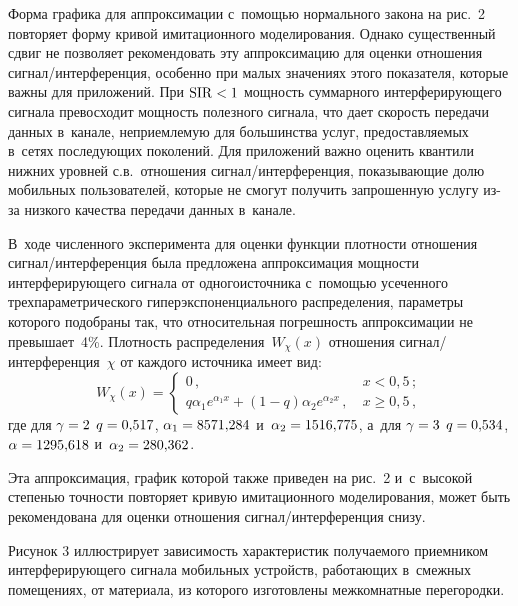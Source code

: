 \begin{multicols}{2}
  Форма графика для аппроксимации с~помощью нормального закона на 
рис.~2 повторяет форму кривой имитационного моделирования. Однако 
существенный сдвиг не позволяет рекомендовать эту аппроксимацию для 
оценки отношения сиг\-нал/ин\-тер\-фе\-рен\-ция, особенно при малых 
значениях этого показателя, которые важны для приложений. При 
$\mathrm{SIR}\hm<1$ мощность суммарного интерферирующего сигнала превосходит 
мощность полезного сигнала, что дает скорость передачи данных в~канале, 
неприемлемую для большинства услуг, предоставляемых в~сетях 
последующих поколений. Для приложений важно оценить квантили нижних 
уровней с.в.\ отношения сиг\-нал/ин\-тер\-фе\-рен\-ция, показывающие долю 
мобильных пользователей, которые не смогут получить запрошенную услугу 
из-за низкого качества передачи данных в~канале. 

В~ходе численного 
эксперимента для оценки функции плот\-ности отношения 
сиг\-нал/ин\-тер\-ферен\-ция была предложена аппроксимация мощ\-ности 
интерфериру\-юще\-го сигнала от одного\linebreak источника с~помощью усеченного 
трехпараметрического гиперэкспо\-нен\-ци\-ального распределения, па\-ра\-мет\-ры 
которого подобраны так, что относительная погрешность аппроксимации не 
превышает~4\%. Плот\-ность распределения~$W_\chi(x)$ отношения  
сиг\-нал/ин\-тер\-фе\-рен\-ция~$\chi$ от каждого источника имеет вид:
$$
W_\chi(x)=\begin{cases}
0\,, &\ x<0{,}5\,;\\[3pt]
q\alpha_1 e^{\alpha_1x} +(1-q)\alpha_2 e^{\alpha_2x}\,, &\ x\geq 0{,}5\,,
\end{cases}
$$
 где для $\gamma\hm=2$ $q \hm= 0{,}517$,  $\alpha_1\hm=8571{,}284$ 
 и~$\alpha_2\hm=1516{,}775$,
 а~для  $\gamma\hm=3$ $q\hm= 0{,}534$,  $\alpha\hm=1295{,}618$ 
и~$\alpha_2\hm= 280{,}362$.
    
  Эта аппроксимация, график которой также приведен на рис.~2 
и~с~высокой степенью точности повторяет кривую имитационного 
моделирования, может быть рекомендована для оценки отношения 
 сиг\-нал/ин\-тер\-фе\-рен\-ция снизу.
  
 


  Рисунок 3 иллюстрирует зависимость характеристик получаемого 
приемником ин\-тер\-фе\-ри\-ру\-юще\-го сигнала мобильных устройств, ра\-бо\-та\-ющих 
в~смежных помещениях, от материала, из которого изготовлены 
межкомнатные перегородки. 
  
 



\end{multicols}
